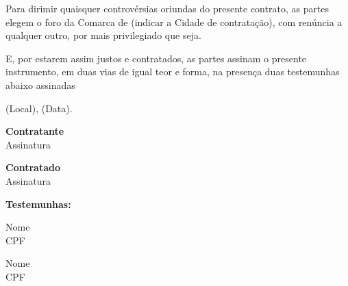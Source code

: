 \documentclass[a4paper,12pt]{article}
\begin{document}
Para dirimir quaisquer controvérsias oriundas do presente contrato, as partes elegem o foro da Comarca de (indicar a Cidade de contratação), com renúncia a qualquer outro, por mais privilegiado que seja.

E, por estarem assim justos e contratados, as partes assinam o presente instrumento, em duas vias de igual teor e forma, na presença duas testemunhas abaixo assinadas

\vspace{1cm}

\begin{center}
(Local), (Data).
\end{center}

\vspace{1cm}

\begin{multicols}{2}
\begin{center}
\textbf{Contratante}\\
Assinatura
\end{center}
\begin{center}
\textbf{Contratado} \\
Assinatura
\end{center}
\end{multicols}
\vspace{1.5cm}

\noindent\textbf{Testemunhas:}
\begin{multicols}{2}
Nome\\
CPF

Nome \\
CPF
\end{multicols}
\end{document}
